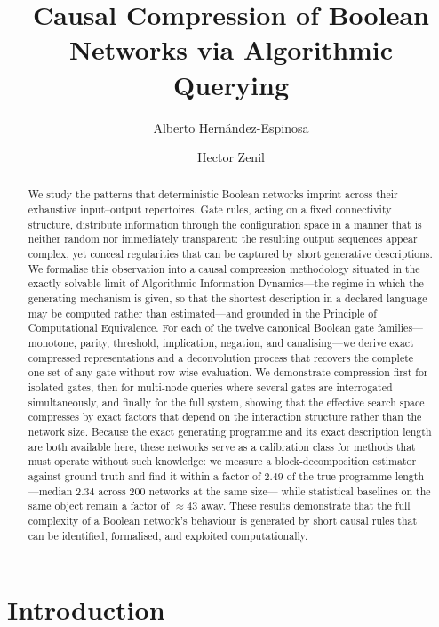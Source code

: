 \documentclass[11pt]{article}
\title{Causal Compression of Boolean Networks via Algorithmic Querying}
\author{Alberto Hern\'andez-Espinosa \and Hector Zenil}
\date{}
\begin{document}
\maketitle

\begin{abstract}
We study the patterns that deterministic Boolean networks imprint across
their exhaustive input--output repertoires.  Gate rules, acting on a fixed
connectivity structure, distribute information through the configuration
space in a manner that is neither random nor immediately transparent: the
resulting output sequences appear complex, yet conceal regularities that
can be captured by short generative descriptions.
We formalise this observation into a causal compression methodology situated
in the exactly solvable limit of Algorithmic Information Dynamics---the
regime in which the generating mechanism is given, so that the shortest
description in a declared language may be computed rather than estimated---and
grounded in the Principle of Computational Equivalence.
For each of the twelve canonical Boolean gate families---monotone, parity,
threshold, implication, negation, and canalising---we derive exact
compressed representations and a deconvolution process that recovers the
complete one-set of any gate without row-wise evaluation.
We demonstrate compression first for isolated gates, then for multi-node
queries where several gates are interrogated simultaneously, and finally
for the full system, showing that the effective search space compresses
by exact factors that depend on the interaction structure rather than
the network size.
Because the exact generating programme and its exact description length are
both available here, these networks serve as a calibration class for methods
that must operate without such knowledge: we measure a block-decomposition
estimator against ground truth and find it within a factor of $2.49$ of the
true programme length---median $2.34$ across 200 networks at the same size---
while statistical baselines on the same object remain a factor of ${\approx}43$
away.
These results demonstrate that the full complexity of a Boolean network's
behaviour is generated by short causal rules that can be identified,
formalised, and exploited computationally.
\end{abstract}


\section{Introduction}\label{sec:intro}
\end{document}
